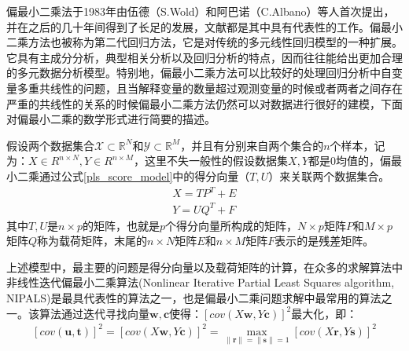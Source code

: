偏最小二乘法于1983年由伍德（S.Wold）和阿巴诺（C.Albano）等人首次提出，并在之后的几十年间得到了长足的发展，文献\cite{KPLS,pls_PLS,pls_PLSR,pls_PLSR2,pls_PLSALL}都是其中具有代表性的工作。偏最小二乘方法也被称为第二代回归方法，它是对传统的多元线性回归模型的一种扩展。它具有主成分分析，典型相关分析以及回归分析的特点，因而往往能给出更加合理的多元数据分析模型。特别地，偏最小二乘方法可以比较好的处理回归分析中自变量多重共线性的问题，且当解释变量的数量超过观测变量的时候或者两者之间存在严重的共线性的关系的时候偏最小二乘方法仍然可以对数据进行很好的建模，下面对偏最小二乘的数学形式进行简要的描述。

假设两个数据集合${\mathcal{X} \subset \mathbb{R}^{N}}$和${\mathcal{Y} \subset \mathbb{R}^{M}}$，并且有分别来自两个集合的$n$个样本，记为：${X \in R^{n\times N},Y \in R^{n\times M}}$，这里不失一般性的假设数据集${X,Y}$都是${0}$均值的，偏最小二乘通过公式\ref{pls_score_model}中的得分向量（$T,U$）来关联两个数据集合。
\begin{equation}
\begin{split}
\label{pls_score_model}
{X=TP^{T}+E}\\
{Y=UQ^{T}+F}
\end{split}
\end{equation}
其中${T,U}$是$n \times p$的矩阵，也就是$p$个得分向量所构成的矩阵，$N \times p$矩阵${P}$和$M \times p$矩阵${Q}$称为载荷矩阵，末尾的$n \times N$矩阵${E}$和$n \times M$矩阵${F}$表示的是残差矩阵。

上述模型中，最主要的问题是得分向量以及载荷矩阵的计算，在众多的求解算法中非线性迭代偏最小二乘算法(Nonlinear Iterative Partial Least Squares algorithm, NIPALS\cite{pls_NIPALS})是最具代表性的算法之一，也是偏最小二乘问题求解中最常用的算法之一。该算法通过迭代寻找向量$\bm{w,c}$使得：$[cov(X\bm{w},Y\bm{c})]^2$最大化，即：
\begin{equation}
\label{pls_max_cov}
\begin{split}
[cov(\bm{u},\bm{t})]^2=[cov(X\bm{w},Y\bm{c})]^2=\max_{\|\bm{r}\|=\|\bm{s}\|=1}[cov(X\bm{r},Y\bm{s})]^2
\end{split}
\end{equation}

